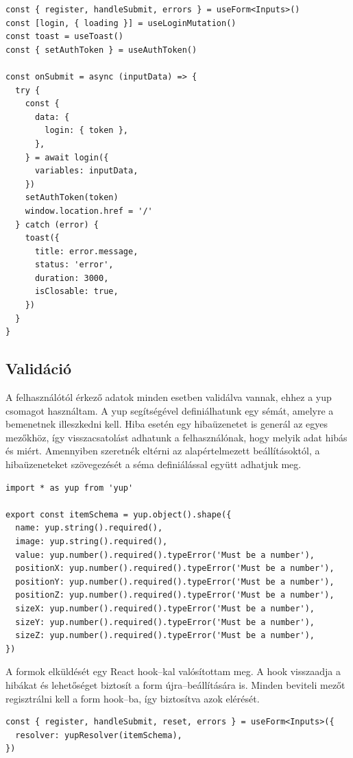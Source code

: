 \begin{lstlisting}[style=ES6]
const { register, handleSubmit, errors } = useForm<Inputs>()
const [login, { loading }] = useLoginMutation()
const toast = useToast()
const { setAuthToken } = useAuthToken()

const onSubmit = async (inputData) => {
  try {
    const {
      data: {
        login: { token },
      },
    } = await login({
      variables: inputData,
    })
    setAuthToken(token)
    window.location.href = '/'
  } catch (error) {
    toast({
      title: error.message,
      status: 'error',
      duration: 3000,
      isClosable: true,
    })
  }
}
\end{lstlisting}

\subsection{Validáció}
A felhasználótól érkező adatok minden esetben validálva vannak, ehhez a yup csomagot használtam.
A yup segítségével definiálhatunk egy sémát, amelyre a bemenetnek illeszkedni kell. 
Hiba esetén egy hibaüzenetet is generál az egyes mezőkhöz, így visszacsatolást adhatunk a felhasználónak, hogy melyik adat hibás és miért.
Amennyiben szeretnék eltérni az alapértelmezett beállításoktól, a hibaüzeneteket szövegezését a séma definiálással együtt adhatjuk meg.

\begin{lstlisting}[style=ES6]
import * as yup from 'yup'

export const itemSchema = yup.object().shape({
  name: yup.string().required(),
  image: yup.string().required(),
  value: yup.number().required().typeError('Must be a number'),
  positionX: yup.number().required().typeError('Must be a number'),
  positionY: yup.number().required().typeError('Must be a number'),
  positionZ: yup.number().required().typeError('Must be a number'),
  sizeX: yup.number().required().typeError('Must be a number'),
  sizeY: yup.number().required().typeError('Must be a number'),
  sizeZ: yup.number().required().typeError('Must be a number'),
})
\end{lstlisting}

A formok elküldését egy React hook–kal valósítottam meg.
A hook visszaadja a hibákat és lehetőséget biztosít a form újra–beállítására is.
Minden beviteli mezőt regisztrálni kell a form hook–ba, így biztosítva azok elérését.

\begin{lstlisting}[style=ES6]
const { register, handleSubmit, reset, errors } = useForm<Inputs>({
  resolver: yupResolver(itemSchema),
})
\end{lstlisting}

